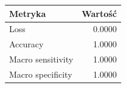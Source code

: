 \begin{tabular}{lr}
\hline
Metryka & Wartość \\
\hline
Loss & 0.0000 \\
Accuracy & 1.0000 \\
Macro sensitivity & 1.0000 \\
Macro specificity & 1.0000 \\
\hline
\end{tabular}